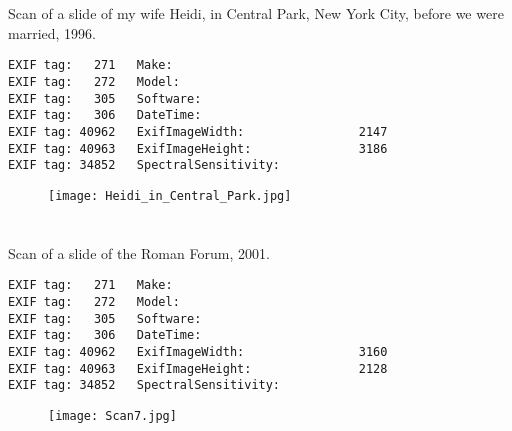 \section{\protect{}}
\noindent Scan of a slide of my wife Heidi, in Central Park, New York City, before we were married, 1996.
\noindent
\begin{lstlisting}
EXIF tag:   271   Make:                          
EXIF tag:   272   Model:                         
EXIF tag:   305   Software:                      
EXIF tag:   306   DateTime:                      
EXIF tag: 40962   ExifImageWidth:                2147
EXIF tag: 40963   ExifImageHeight:               3186
EXIF tag: 34852   SpectralSensitivity:           

\end{lstlisting}
\clearpage
\begin{figure}
\raggedleft
\texttt{[image: Heidi\_in\_Central\_Park.jpg]}
\end{figure}


\clearpage
\section{\protect{}}
\noindent Scan of a slide of the Roman Forum, 2001.
\noindent
\begin{lstlisting}
EXIF tag:   271   Make:                          
EXIF tag:   272   Model:                         
EXIF tag:   305   Software:                      
EXIF tag:   306   DateTime:                      
EXIF tag: 40962   ExifImageWidth:                3160
EXIF tag: 40963   ExifImageHeight:               2128
EXIF tag: 34852   SpectralSensitivity:           

\end{lstlisting}
\clearpage
\begin{figure}
\raggedleft
\texttt{[image: Scan7.jpg]}
\end{figure}


\clearpage
